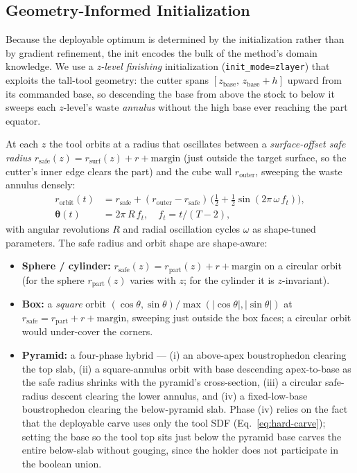 \subsection{Geometry-Informed Initialization}
\label{sec:init}

Because the deployable optimum is determined by the initialization rather than
by gradient refinement, the init encodes the bulk of the method's domain
knowledge. We use a \emph{z-level finishing} initialization
(\texttt{init\_mode=zlayer}) that exploits the tall-tool geometry: the cutter
spans $[z_{\mathrm{base}},\, z_{\mathrm{base}}{+}h]$ upward from its commanded
base, so descending the base from above the stock to below it sweeps each
$z$-level's waste \emph{annulus} without the high base ever reaching the part
equator.

At each $z$ the tool orbits at a radius that oscillates between a
\emph{surface-offset safe radius} $r_{\mathrm{safe}}(z) = r_{\mathrm{surf}}(z) + r + \mathrm{margin}$
(just outside the target surface, so the cutter's inner edge clears the part)
and the cube wall $r_{\mathrm{outer}}$, sweeping the waste annulus densely:
\begin{align}
  r_{\mathrm{orbit}}(t) &= r_{\mathrm{safe}} + (r_{\mathrm{outer}} - r_{\mathrm{safe}})\,\bigl(\tfrac{1}{2} + \tfrac{1}{2}\sin(2\pi\,\omega\, f_t)\bigr), \\
  \boldsymbol{\theta}(t) &= 2\pi\, R\, f_t, \quad f_t = t/(T{-}2),
\end{align}
with angular revolutions $R$ and radial oscillation cycles $\omega$ as
shape-tuned parameters. The safe radius and orbit shape are shape-aware:
\begin{itemize}\itemsep0pt
  \item \textbf{Sphere / cylinder:} $r_{\mathrm{safe}}(z) = r_{\mathrm{part}}(z) + r + \mathrm{margin}$
        on a circular orbit (for the sphere $r_{\mathrm{part}}(z)$ varies with $z$;
        for the cylinder it is $z$-invariant).
  \item \textbf{Box:} a \emph{square} orbit
        $(\cos\theta,\sin\theta)/\max(|\cos\theta|,|\sin\theta|)$ at
        $r_{\mathrm{safe}} = r_{\mathrm{part}} + r + \mathrm{margin}$, sweeping
        just outside the box faces; a circular orbit would under-cover the
        corners.
  \item \textbf{Pyramid:} a four-phase hybrid --- (i) an above-apex
        boustrophedon clearing the top slab, (ii) a square-annulus orbit with
        base descending apex-to-base as the safe radius shrinks with the
        pyramid's cross-section, (iii) a circular safe-radius descent clearing
        the lower annulus, and (iv) a fixed-low-base boustrophedon clearing the
        below-pyramid slab. Phase (iv) relies on the fact that the deployable
        carve uses only the tool SDF (Eq.~\ref{eq:hard-carve}); setting the base
        so the tool top sits just below the pyramid base carves the entire
        below-slab without gouging, since the holder does not participate in the
        boolean union.
\end{itemize}
